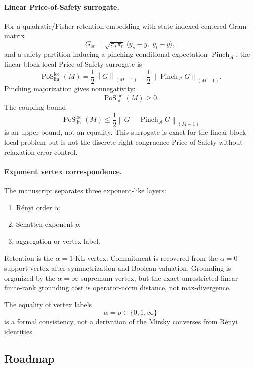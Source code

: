 \documentclass[12pt]{article}
\theoremstyle{definition}
\DeclareMathOperator{\PoS}{PoS}
\newcommand{\EA}{\operatorname{Pinch}_{\mathcal A}}
\newcommand{\KyF}[2]{\left\|#1\right\|_{(#2)}}
\newcommand{\PoSlin}{\PoS_{\mathrm{lin}}^{\mathrm{loc}}}
\begin{document}
\paragraph{Linear Price-of-Safety surrogate.}
For a quadratic/Fisher retention embedding with state-indexed centered Gram
matrix
\[
G_{st}
=
\sqrt{\pi_s\pi_t}\,
\langle y_s-\bar y,\;y_t-\bar y\rangle,
\]
and a safety partition inducing a pinching conditional expectation
$\EA$, the linear block-local Price-of-Safety surrogate is
\[
\PoSlin(M)
=
\frac12\KyF{G}{M-1}
-
\frac12\KyF{\EA G}{M-1}.
\]
Pinching majorization gives nonnegativity:
\[
\PoSlin(M)\ge0.
\]
The coupling bound
\[
\PoSlin(M)
\le
\frac12\KyF{G-\EA G}{M-1}
\]
is an upper bound, not an equality.  This surrogate is exact for the linear
block-local problem but is not the discrete right-congruence Price of Safety
without relaxation-error control.

\paragraph{Exponent vertex correspondence.}
The manuscript separates three exponent-like layers:
\begin{enumerate}[nosep,label=(\arabic*)]
\item R\'enyi order $\alpha$;
\item Schatten exponent $p$;
\item aggregation or vertex label.
\end{enumerate}

Retention is the $\alpha=1$ KL vertex.  Commitment is recovered from the
$\alpha=0$ support vertex after symmetrization and Boolean valuation.
Grounding is organized by the $\alpha=\infty$ supremum vertex, but the exact
unrestricted linear finite-rank grounding cost is operator-norm distance, not
max-divergence.

The equality of vertex labels
\[
\alpha=p\in\{0,1,\infty\}
\]
is a formal consistency, not a derivation of the Mirsky converses from
R\'enyi identities.

\subsection{Roadmap}
\label{subsec:roadmap}
\end{document}
